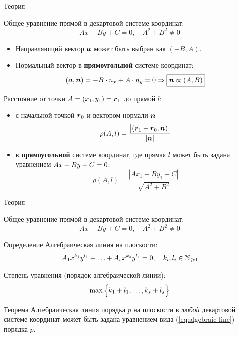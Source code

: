 \documentclass[russian]{beamer}
\begin{document}
  \begin{frame}{Теория}
  
    Общее уравнение прямой в декартовой системе координат:
    \begin{equation}
      Ax + By + C = 0, \quad A^2 + B^2 \not= 0
    \end{equation}
    
    \pause
    
    \begin{itemize}
      \item Направляющий вектор $\boldsymbol a$ может быть выбран как $(-B, A)$.
      
      \pause
      
      \item Нормальный вектор в \textbf{прямоугольной} системе координат:
      \[
        (\boldsymbol a, \boldsymbol n) = -B \cdot n_x + A \cdot n_y = 0 \Rightarrow \boxed{\boldsymbol n \propto (A, B)}
      \]
    \end{itemize}
  
    \pause
    
    Расстояние от точки $A \hm= (x_1, y_1) \hm= \bds r_1$ до прямой $l$:
    \begin{itemize}
      \item с начальной точкой $\boldsymbol r_0$ и вектором нормали $\boldsymbol n$
      \[
        \rho(A, l) = \frac{\bigl|(\boldsymbol r_1 - \boldsymbol r_0, \boldsymbol n)\bigr|}{|\boldsymbol n|}
      \]
      
      \pause
      
      \item в \textbf{прямоугольной} системе координат, где прямая $l$ может быть задана уравнением $Ax + By + C \hm= 0$:
      \[
        \rho(A, l) = \frac{|Ax_1 + By_1 + C|}{\sqrt{A^2 + B^2}}
      \]
    \end{itemize}
  \end{frame}


  \begin{frame}{Теория}
  
    Общее уравнение прямой в декартовой системе координат:
    \[
      Ax + By + C = 0, \quad A^2 + B^2 \not= 0
    \]
    
    \begin{block}{Определение}
      Алгебраическая линия на плоскости:
      \begin{equation}\label{eq:algebraic-line}
        A_1 x^{k_1} y^{l_1} + \ldots + A_s x^{k_s} y^{l_s} = 0, \quad k_i, l_i \in \mathbb N_{\geqslant 0}
      \end{equation}
      
      Степень уравнения (порядок алгебраической линии):
      \[
        \max{\Bigl\{k_1 + l_1, \ldots, k_s + l_s\Bigr\}}
      \]
    \end{block}
    
    \begin{block}{Теорема}
      Алгебраическая линия порядка $p$ на плоскости в \emph{любой} декартовой системе координат может быть задана уравнением вида (\ref{eq:algebraic-line}) порядка $p$.
    \end{block}

  \end{frame}
\end{document}
